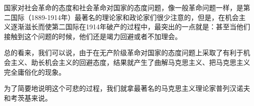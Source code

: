 
\mbox{}

\mbox{}

国家对社会革命的态度和社会革命对国家的态度问题，像一般革命问题一样，是第二国际（1889-1914年）最著名的理论家和政论家们很少注意的，但是，在机会主义逐渐滋长而使第二国际在1914年破产的过程中，最突出的一点就是：甚至当他们接触到这个问题的时候，他们还是{\kaishu 竭力回避}或者不加理会。

\pskip

总的看来，我们可以说，由于在无产阶级革命对国家的态度问题上采取了有利于机会主义、助长机会主义的{\kaishu 回避态度}，结果就产生了{\kaishu 曲解}马克思主义、把马克思主义完全庸俗化的现象。

\pskip

为了简要地说明这个可悲的过程，我们就拿最著名的马克思主义理论家普列汉诺夫和考茨基来说。
